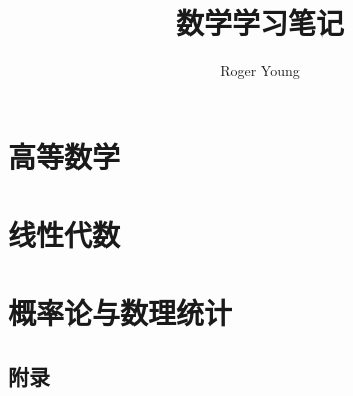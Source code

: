 \documentclass{ctexbook}
\newcommand{\documentTitle}
    {\texorpdfstring{数学学习笔记}{数学学习笔记}}
\newcommand{\documentAuthor}{Roger Young}
\begin{document}
\title{\documentTitle}
\author{\documentAuthor}

\maketitle
\tableofcontents

\part{高等数学}















\part{线性代数}







\part{概率论与数理统计}














\chapter*{附录}
\printindex
\printglossaries
\end{document}
